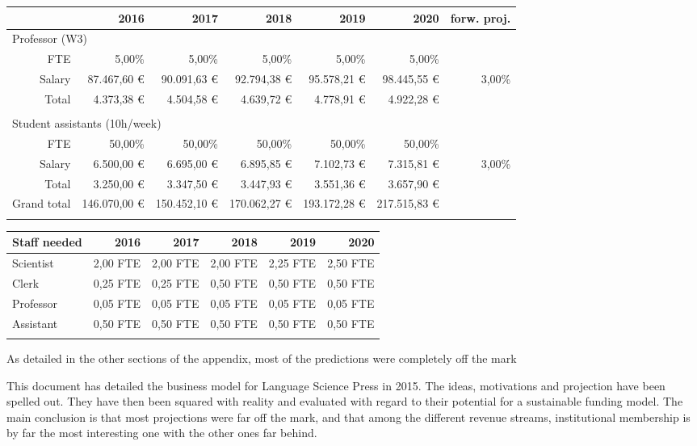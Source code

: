 \documentclass[nonflat,smallfont
]{langsci/langscibook}
\newcommand{\background}[1]{ 
  \vspace{5mm}
  \renewcommand{\tblslinecolour}{lsDarkBlue}
  \tblssy[red]{explore2}{Background}{\vspace*{-5mm}#1}
}
\newcommand{\langscisolution}[1]{
  \renewcommand{\tblslinecolour}{lsLightBlue}
  \tblssy{langsci}{LangSci solution}{\vspace*{-5mm}#1}
}
\newcommand{\evaluation}[1]{
  \renewcommand{\tblslinecolour}{lsLightOrange}
  \tblssy{receipt}{Evaluation}{\vspace*{-5mm}#1}
}
\newcommand{\othersolutions}[1]{
  \renewcommand{\tblslinecolour}{lsDarkGreenOne}
  \tblssy{more}{Other solutions}{\vspace*{-5mm}#1}
}
\renewcommand{\tblssy}[4][black!12]{%
  \renewcommand{\langscisymbol}{#2}\renewcommand{\tblsboxcolor}{#1}
  \begin{mdframed}[style=yellowexercise,frametitle={#3}]
    #4
  \end{mdframed}
}
\begin{document}
{{\begin{tabular}{lrrrrrrr}
\midrule
& & \textbf{2016} & \textbf{2017} & \textbf{2018} & \textbf{2019} & \textbf{2020} & \textbf{forw. proj.}\\
\midrule 
\multicolumn{5}{l}{ Professor (W3)}\\
\midrule
&  FTE &  5,00\% &  5,00\% &  5,00\% &  5,00\% &  5,00\% & ~\\
&  Salary &  87.467,60 € &  90.091,63 € &  92.794,38 € &  95.578,21 € &  98.445,55 € &  3,00\%\\
 &  Total &  4.373,38 € &  4.504,58 € &  4.639,72 € &  4.778,91 € &  4.922,28 € & ~\\
\\
\multicolumn{5}{l}{ Student assistants (10h/week)}\\
\midrule
&  FTE &  50,00\% &  50,00\% &  50,00\% &  50,00\% &  50,00\% & ~\\
&  Salary &  6.500,00 € &  6.695,00 € &  6.895,85 € &  7.102,73 € &  7.315,81 € &  3,00\%\\
 &  Total &  3.250,00 € &  3.347,50 € &  3.447,93 € &  3.551,36 € &  3.657,90 € & ~\\
\midrule
\multicolumn{2}{l}{Grand total}  &  146.070,00 € &  150.452,10 € &  170.062,27 € &  193.172,28 € &  217.515,83 € & ~\\
\lspbottomrule
\end{tabular}
}

\bigskip
{\footnotesize
\noindent
\begin{tabularx}{\textwidth}{Xrrrrr}
\lsptoprule
Staff needed  & \textbf{2016} & \textbf{2017} & \textbf{2018} & \textbf{2019} & \textbf{2020}\\
\midrule
Scientist &  2,00 FTE &  2,00 FTE &  2,00 FTE &  2,25 FTE &  2,50 FTE\\
Clerk &  0,25 FTE &  0,25 FTE &  0,50 FTE &  0,50 FTE &  0,50 FTE\\
Professor &  0,05 FTE &  0,05 FTE &  0,05 FTE &  0,05 FTE &  0,05 FTE\\
Assistant &  0,50 FTE &  0,50 FTE &  0,50 FTE &  0,50 FTE &  0,50 FTE\\
\lspbottomrule
\end{tabularx} 
}
}
\evaluation{As detailed in the other sections of the appendix, most of the predictions were completely off the mark}

This document has detailed the business model for Language Science Press in 2015. The ideas, motivations and projection have been spelled out. They have then been squared with reality and evaluated with regard to their potential for a sustainable funding model. The main conclusion is that most projections were far off the mark, and that among the different revenue streams, institutional membership is by far the most interesting one with the other ones far behind. 

\end{document}
